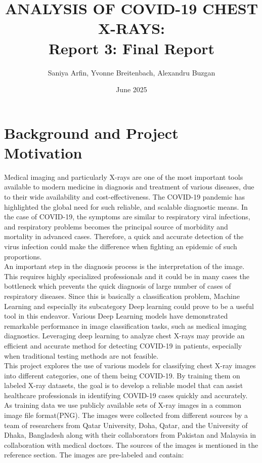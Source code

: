 \documentclass{article}
\title{ANALYSIS OF COVID-19 CHEST X-RAYS: \\Report 3: Final Report}
\author{Saniya Arfin, Yvonne Breitenbach, Alexandru Buzgan}
\date{June 2025}
\begin{document}
\maketitle

\tableofcontents

\newpage 

\section{Background and Project Motivation}
Medical imaging and particularly X-rays are one of the most important tools available to modern medicine in diagnosis and treatment of various diseases, due to their wide availability and cost-effectiveness.  The COVID-19 pandemic has highlighted the global need for such reliable, and scalable diagnostic means. In the case of COVID-19, the symptoms are similar to respiratory viral infections, and respiratory problems becomes the principal source of morbidity and mortality in advanced cases. Therefore, a quick and accurate detection of the virus infection could make the difference when fighting an epidemic of such proportions.\\
An important step in the diagnosis process is the interpretation of the image. This requires highly specialized professionals and it could be in many cases the bottleneck which prevents the quick diagnosis of large number of cases of respiratory diseases. Since this is basically a classification problem, Machine Learning and especially its subcategory Deep learning could prove to be a useful tool in this endeavor. Various Deep Learning models have demonstrated remarkable performance in image classification tasks, such as medical imaging diagnostics. Leveraging deep learning to analyze chest X-rays may provide an efficient and accurate method for detecting COVID-19 in patients, especially when traditional testing methods are not feasible.\\
This project explores the use of various models for classifying chest X-ray images into different categories, one of them being COVID-19. By training them on labeled X-ray datasets, the goal is to develop a reliable model that can assist healthcare professionals in identifying COVID-19 cases quickly and accurately.\\
As training data we use publicly available sets of X-ray images in a common image file format(PNG). The images were collected from different sources by a team of researchers from Qatar University, Doha, Qatar, and the University of Dhaka, Bangladesh along with their collaborators from Pakistan and Malaysia in collaboration with medical doctors. The sources of the images is mentioned in the reference section. The images are pre-labeled and contain:
\end{document}
